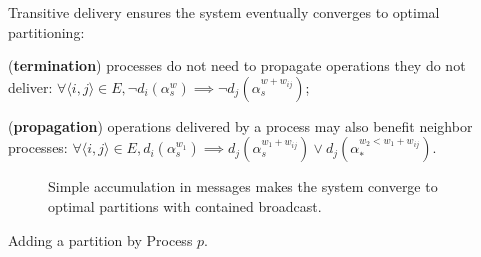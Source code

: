 \begin{definition}
  Transitive delivery ensures the system eventually converges to
  optimal partitioning:
  \begin{inparaenum}[(i)]
  \item (\textbf{termination}) processes do not need to propagate
    operations they do not deliver: $\forall \langle i, j \rangle \in
    E, \neg d_i(\alpha_{s}^w)\implies \neg
    d_j(\alpha_{s}^{w+w_{ij}})$;
  \item (\textbf{propagation}) operations delivered by a process may
    also benefit neighbor processes: $\forall \langle i, j \rangle \in
    E, d_i(\alpha_{s}^{w_1}) \implies
    d_j(\alpha_{s}^{w_1+w_{ij}}) \vee
    d_j(\alpha_{*}^{w_2 < w_1 + w_{ij}})$.
  \end{inparaenum}
\end{definition}


\begin{figure*}
  \begin{center}
    \subfloat[Part A][\label{fig:addA}Both Process $a$ and
      Process $c$ initiate a partition.
      $w_{ab} = 1.5$; $w_{bc} = w_{cd} = w_{bd} = 1$.]{}
    \hspace{5pt}
    \hspace{5pt}
    \hspace{5pt}
    \caption{\label{fig:add}Simple accumulation in messages makes the
      system converge to optimal partitions with contained
      broadcast.}
  \end{center}
\end{figure*}

\begin{algorithm}
  
  \caption{\label{algo:add}Adding a partition by Process $p$.}
\end{algorithm}


